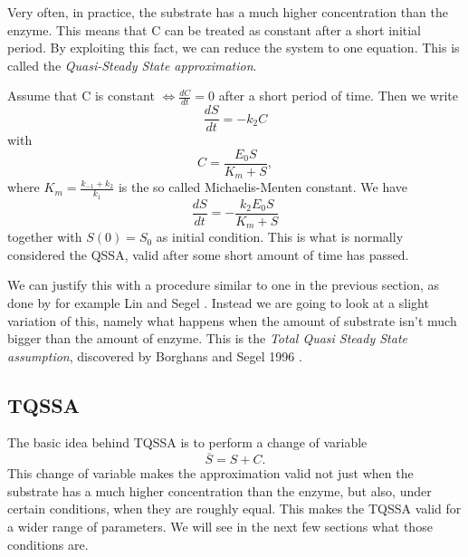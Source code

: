 \documentclass[12pt]{article}
\begin{document}
Very often, in practice, the substrate has a much higher concentration
than the enzyme. This means that C can be treated as constant after a
short initial period. By exploiting this fact, we can reduce the
system to one equation. This is called the \textit{Quasi-Steady State
  approximation}.

Assume that C is constant $\iff \frac{dC}{dt} = 0$ after a short
period of time. Then we write
\begin{equation}
\frac{dS}{dt} = -k_2 C
\end{equation}
with
\begin{equation}
C = \frac{E_0 S}{K_m +S},
\end{equation}
where $K_m = \frac{k_{-1} + k_2}{k_1}$ is the so called {Michaelis-Menten
constant}. We have
\begin{equation}
\frac{dS}{dt} = - \frac{k_2 E_0 S}{K_m + S}
\end{equation}
together with $S(0) = S_0$ as initial condition. This is what is
normally considered the QSSA, valid after some short amount of time
has passed.

We can justify this with a procedure similar to one in the previous
section, as done by for example Lin and Segel
\cite{lin1974mathematics}. Instead we are going to look at a slight
variation of this, namely what happens when the amount of substrate
isn't much bigger than the amount of enzyme. This is the
\textit{Total Quasi Steady State assumption}, discovered by Borghans
and Segel 1996 \cite{borghans1996extending}.

\subsection{TQSSA}

The basic idea behind TQSSA is to perform a change of variable
\begin{equation}
\overline{S} = S + C.
\end{equation}
This change of variable makes the approximation valid not just when
the substrate has a much higher concentration than the enzyme, but
also, under certain conditions, when they are roughly equal. This
makes the TQSSA valid for a wider range of parameters. We will see in
the next few sections what those conditions are.
\end{document}
